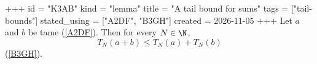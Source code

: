 +++
id = "K3AB"
kind = "lemma"
title = "A tail bound for sums"
tags = ["tail-bounds"]
stated_using = ["A2DF", "B3GH"]
created = 2026-11-05
+++
Let $a$ and $b$ be tame (\ref{A2DF}). Then for every $N \in \N$,
\[
  T_N(a + b) \le T_N(a) + T_N(b)
\]
(\ref{B3GH}).
